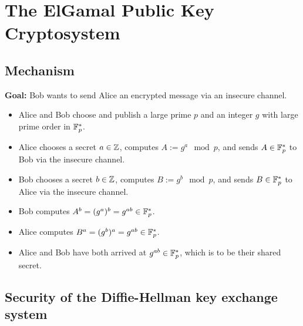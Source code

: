 
\section{The ElGamal Public Key Cryptosystem}
\setcounter{theorem}{0}
\setcounter{equation}{0}

\subsection{Mechanism}

\textbf{Goal:} Bob wants to send Alice an encrypted message via an insecure channel.
\begin{itemize}
\item	Alice and Bob choose and publish a large prime $p$ and an integer $g$ with large prime order in $\mathbb{F}_{p}^{*}$.
\item	Alice chooses a secret $a \in \mathbb{Z}$, computes $A := g^{a} \mod p$, and sends $A \in\mathbb{F}_{p}^{*}$ to Bob
		via the insecure channel.
\item	Bob chooses a secret $b \in \mathbb{Z}$, computes $B := g^{b} \mod p$, and sends $B \in\mathbb{F}_{p}^{*}$ to Alice
		via the insecure channel.
\item	Bob computes $A^{b} = (g^{a})^{b} = g^{ab} \in \mathbb{F}_{p}^{*}$.
\item	Alice computes $B^{a} = (g^{b})^{a} = g^{ab} \in \mathbb{F}_{p}^{*}$.
\item	Alice and Bob have both arrived at $g^{ab} \in \mathbb{F}_{p}^{*}$, which is to be their shared secret.
\end{itemize}

\subsection{Security of the Diffie-Hellman key exchange system}

